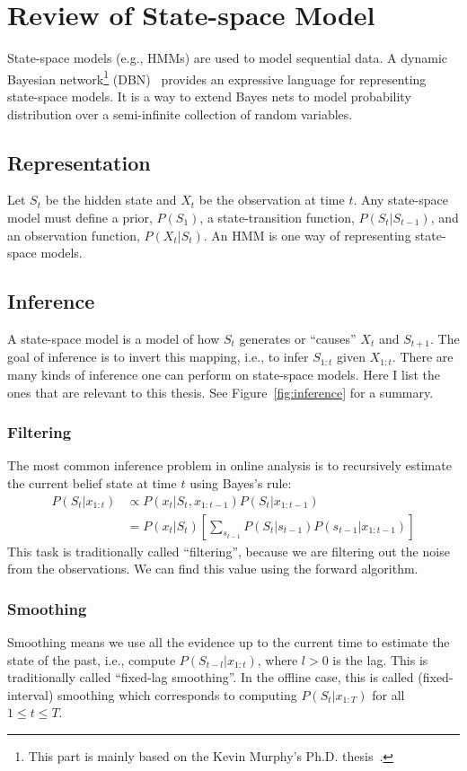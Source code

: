 \chapter{Review of State-space Model}\label{app:dbn} State-space models (e.g.,
HMMs) are used to model sequential data. A dynamic Bayesian network\footnote{This part is mainly based on the Kevin Murphy's Ph.D. thesis~\cite{murphy02}.} (DBN)~\cite{dean89} 
provides an expressive language for representing
state-space models. It is a way to extend
Bayes nets to model probability distribution over a semi-infinite collection  of
random variables. 

\section{Representation}
Let $S_t$ be the hidden state and $X_t$ be the observation at time $t$.
Any state-space model must define a prior, $P(S_1)$, a state-transition function, $P(S_t|S_{t-1})$, and an observation function, $P(X_t|S_t)$. An HMM
is one way of representing state-space models.

\section{Inference}\label{sec:inference}
A state-space model is a model of how $S_t$ generates or ``causes'' $X_t$ and
$S_{t+1}$. The goal of inference is to invert this mapping, i.e., to infer
$S_{1:t}$ given $X_{1:t}$. There are many kinds of inference one can perform on
state-space models. Here I list the ones that are relevant to this thesis. See
Figure~\ref{fig:inference} for a summary.

\subsection{Filtering}
The most common inference problem in online analysis is to recursively estimate
the current belief state at time $t$ using Bayes's rule:
\begin{align*}
P(S_t | x_{1:t}) & \propto P(x_t | S_t, x_{1:t-1})P(S_t | x_{1:t-1}) \\
         & = P(x_t | S_t) \left[\sum_{s_{t - 1}}
           P(S_t | s_{t - 1})P(s_{t - 1} | x_{1:t - 1})\right]
\end{align*}
This task is traditionally called ``filtering'', because we are filtering out
the noise from the observations. We can find this value using the forward
algorithm.

\subsection{Smoothing}
Smoothing means we use all the evidence up to the current time to estimate the
state of the past, i.e., compute $P(S_{t-l}|x_{1:t})$, where $l>0$ is the lag.
This is traditionally called ``fixed-lag smoothing''. In the offline case, this
is called (fixed-interval) smoothing which corresponds to computing
$P(S_t|x_{1:T})$ for all $1\leq t\leq T$.

